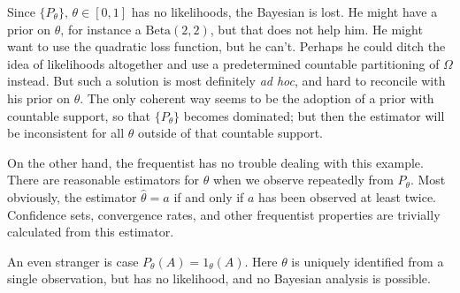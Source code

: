 Since $\{P_{\theta}\},\,\theta\in[0,1]$ has no likelihoods, the Bayesian
is lost. He might have a prior on $\theta$, for instance a $\textrm{Beta}(2,2)$,
but that does not help him. He might want to use the quadratic loss
function, but he can't. Perhaps he could ditch the idea of likelihoods
altogether and use a predetermined countable partitioning of $\Omega$
instead. But such a solution is most definitely \emph{ad hoc}, and
hard to reconcile with his prior on $\theta$. The only coherent way
seems to be the adoption of a prior with countable support, so that
$\{P_{\theta}\}$ becomes dominated; but then the estimator will be
inconsistent for all $\theta$ outside of that countable support.

On the other hand, the frequentist has no trouble dealing with this
example. There are reasonable estimators for $\theta$ when we observe
repeatedly from $P_{\theta}$. Most obviously, the estimator $\hat{\theta}=a$
if and only if $a$ has been observed at least twice. Confidence sets,
convergence rates, and other frequentist properties are trivially
calculated from this estimator.

An even stranger is case $P_{\theta}(A)=1_{\theta}(A)$. Here $\theta$
is uniquely identified from a single observation, but has no likelihood,
and no Bayesian analysis is possible.

